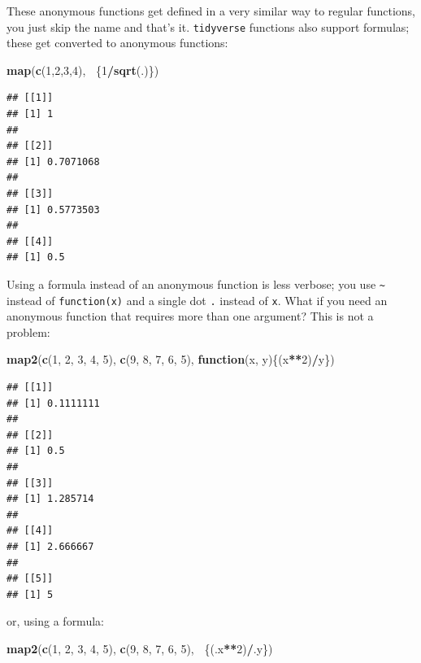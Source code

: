 \documentclass[]{gitbook}
\newenvironment{Shaded}{\begin{snugshade}}{\end{snugshade}}
\newcommand{\ControlFlowTok}[1]{\textcolor[rgb]{0.13,0.29,0.53}{\textbf{#1}}}
\newcommand{\DecValTok}[1]{\textcolor[rgb]{0.00,0.00,0.81}{#1}}
\newcommand{\KeywordTok}[1]{\textcolor[rgb]{0.13,0.29,0.53}{\textbf{#1}}}
\newcommand{\NormalTok}[1]{#1}
\newcommand{\OperatorTok}[1]{\textcolor[rgb]{0.81,0.36,0.00}{\textbf{#1}}}
\begin{document}
These anonymous functions get defined in a very similar way to regular functions, you just skip the
name and that's it. \texttt{tidyverse} functions also support formulas; these get converted to anonymous functions:

\begin{Shaded}
\begin{Highlighting}[]
\KeywordTok{map}\NormalTok{(}\KeywordTok{c}\NormalTok{(}\DecValTok{1}\NormalTok{,}\DecValTok{2}\NormalTok{,}\DecValTok{3}\NormalTok{,}\DecValTok{4}\NormalTok{), }\OperatorTok{~}\NormalTok{\{}\DecValTok{1}\OperatorTok{/}\KeywordTok{sqrt}\NormalTok{(.)\})}
\end{Highlighting}
\end{Shaded}

\begin{verbatim}
## [[1]]
## [1] 1
## 
## [[2]]
## [1] 0.7071068
## 
## [[3]]
## [1] 0.5773503
## 
## [[4]]
## [1] 0.5
\end{verbatim}

Using a formula instead of an anonymous function is less verbose; you use \texttt{\textasciitilde{}} instead of \texttt{function(x)}
and a single dot \texttt{.} instead of \texttt{x}. What if you need an anonymous function that requires more than
one argument? This is not a problem:

\begin{Shaded}
\begin{Highlighting}[]
\KeywordTok{map2}\NormalTok{(}\KeywordTok{c}\NormalTok{(}\DecValTok{1}\NormalTok{, }\DecValTok{2}\NormalTok{, }\DecValTok{3}\NormalTok{, }\DecValTok{4}\NormalTok{, }\DecValTok{5}\NormalTok{), }\KeywordTok{c}\NormalTok{(}\DecValTok{9}\NormalTok{, }\DecValTok{8}\NormalTok{, }\DecValTok{7}\NormalTok{, }\DecValTok{6}\NormalTok{, }\DecValTok{5}\NormalTok{), }\ControlFlowTok{function}\NormalTok{(x, y)\{(x}\OperatorTok{**}\DecValTok{2}\NormalTok{)}\OperatorTok{/}\NormalTok{y\})}
\end{Highlighting}
\end{Shaded}

\begin{verbatim}
## [[1]]
## [1] 0.1111111
## 
## [[2]]
## [1] 0.5
## 
## [[3]]
## [1] 1.285714
## 
## [[4]]
## [1] 2.666667
## 
## [[5]]
## [1] 5
\end{verbatim}

or, using a formula:

\begin{Shaded}
\begin{Highlighting}[]
\KeywordTok{map2}\NormalTok{(}\KeywordTok{c}\NormalTok{(}\DecValTok{1}\NormalTok{, }\DecValTok{2}\NormalTok{, }\DecValTok{3}\NormalTok{, }\DecValTok{4}\NormalTok{, }\DecValTok{5}\NormalTok{), }\KeywordTok{c}\NormalTok{(}\DecValTok{9}\NormalTok{, }\DecValTok{8}\NormalTok{, }\DecValTok{7}\NormalTok{, }\DecValTok{6}\NormalTok{, }\DecValTok{5}\NormalTok{), }\OperatorTok{~}\NormalTok{\{(.x}\OperatorTok{**}\DecValTok{2}\NormalTok{)}\OperatorTok{/}\NormalTok{.y\})}
\end{Highlighting}
\end{Shaded}
\end{document}
